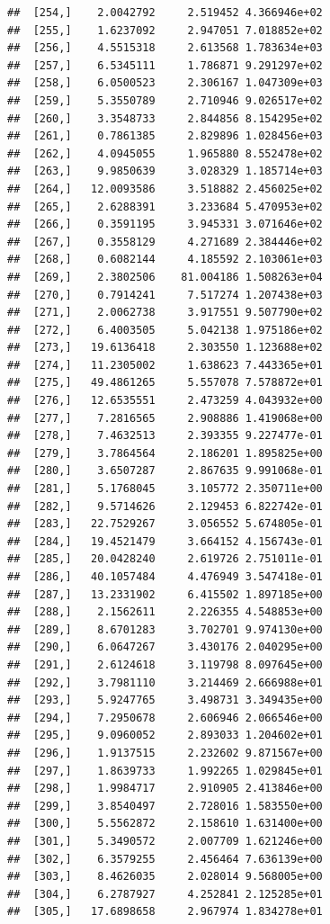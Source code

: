 \documentclass[article]{jss}\usepackage[]{graphicx}\usepackage[]{xcolor}
\makeatletter
\newenvironment{kframe}{%
 \def\at@end@of@kframe{}%
 \ifinner\ifhmode%
  \def\at@end@of@kframe{\end{minipage}}%
  \begin{minipage}{\columnwidth}%
 \fi\fi%
 \def\FrameCommand##1{\hskip\@totalleftmargin \hskip-\fboxsep
 \colorbox{shadecolor}{##1}\hskip-\fboxsep
     \hskip-\linewidth \hskip-\@totalleftmargin \hskip\columnwidth}%
 \MakeFramed {\advance\hsize-\width
   \@totalleftmargin\z@ \linewidth\hsize
   \@setminipage}}%
 {\par\unskip\endMakeFramed%
 \at@end@of@kframe}
\newenvironment{knitrout}{}{} %
\makeatother
\begin{document}
\begin{knitrout}
\begin{kframe}
\begin{verbatim}
##  [254,]    2.0042792     2.519452 4.366946e+02
##  [255,]    1.6237092     2.947051 7.018852e+02
##  [256,]    4.5515318     2.613568 1.783634e+03
##  [257,]    6.5345111     1.786871 9.291297e+02
##  [258,]    6.0500523     2.306167 1.047309e+03
##  [259,]    5.3550789     2.710946 9.026517e+02
##  [260,]    3.3548733     2.844856 8.154295e+02
##  [261,]    0.7861385     2.829896 1.028456e+03
##  [262,]    4.0945055     1.965880 8.552478e+02
##  [263,]    9.9850639     3.028329 1.185714e+03
##  [264,]   12.0093586     3.518882 2.456025e+02
##  [265,]    2.6288391     3.233684 5.470953e+02
##  [266,]    0.3591195     3.945331 3.071646e+02
##  [267,]    0.3558129     4.271689 2.384446e+02
##  [268,]    0.6082144     4.185592 2.103061e+03
##  [269,]    2.3802506    81.004186 1.508263e+04
##  [270,]    0.7914241     7.517274 1.207438e+03
##  [271,]    2.0062738     3.917551 9.507790e+02
##  [272,]    6.4003505     5.042138 1.975186e+02
##  [273,]   19.6136418     2.303550 1.123688e+02
##  [274,]   11.2305002     1.638623 7.443365e+01
##  [275,]   49.4861265     5.557078 7.578872e+01
##  [276,]   12.6535551     2.473259 4.043932e+00
##  [277,]    7.2816565     2.908886 1.419068e+00
##  [278,]    7.4632513     2.393355 9.227477e-01
##  [279,]    3.7864564     2.186201 1.895825e+00
##  [280,]    3.6507287     2.867635 9.991068e-01
##  [281,]    5.1768045     3.105772 2.350711e+00
##  [282,]    9.5714626     2.129453 6.822742e-01
##  [283,]   22.7529267     3.056552 5.674805e-01
##  [284,]   19.4521479     3.664152 4.156743e-01
##  [285,]   20.0428240     2.619726 2.751011e-01
##  [286,]   40.1057484     4.476949 3.547418e-01
##  [287,]   13.2331902     6.415502 1.897185e+00
##  [288,]    2.1562611     2.226355 4.548853e+00
##  [289,]    8.6701283     3.702701 9.974130e+00
##  [290,]    6.0647267     3.430176 2.040295e+00
##  [291,]    2.6124618     3.119798 8.097645e+00
##  [292,]    3.7981110     3.214469 2.666988e+01
##  [293,]    5.9247765     3.498731 3.349435e+00
##  [294,]    7.2950678     2.606946 2.066546e+00
##  [295,]    9.0960052     2.893033 1.204602e+01
##  [296,]    1.9137515     2.232602 9.871567e+00
##  [297,]    1.8639733     1.992265 1.029845e+01
##  [298,]    1.9984717     2.910905 2.413846e+00
##  [299,]    3.8540497     2.728016 1.583550e+00
##  [300,]    5.5562872     2.158610 1.631400e+00
##  [301,]    5.3490572     2.007709 1.621246e+00
##  [302,]    6.3579255     2.456464 7.636139e+00
##  [303,]    8.4626035     2.028014 9.568005e+00
##  [304,]    6.2787927     4.252841 2.125285e+01
##  [305,]   17.6898658     2.967974 1.834278e+01

\end{verbatim}
\end{kframe}
\end{knitrout}
\end{document}
